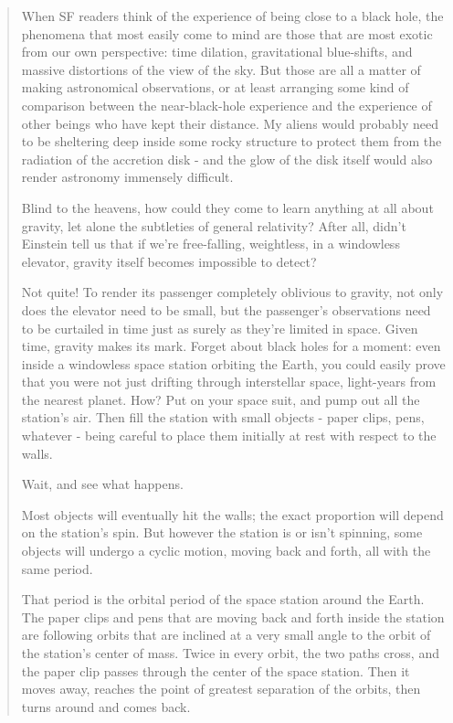 \begin{quote}
  When SF readers think of the experience of being close to a black 
  hole, the phenomena that most easily come to mind are those that are 
  most exotic from our own perspective: time dilation, gravitational 
  blue-shifts, and massive distortions of the view of the sky.  But 
  those are all a matter of making astronomical observations, or at 
  least arranging some kind of comparison between the near-black-hole 
  experience and the experience of other beings who have kept their 
  distance.  My aliens would probably need to be sheltering deep inside
  some rocky structure to protect them from the radiation of the 
  accretion disk - and the glow of the disk itself would also render 
  astronomy immensely difficult.

  Blind to the heavens, how could they come to learn anything at all 
  about gravity, let alone the subtleties of general relativity?  After
  all, didn't Einstein tell us that if we're free-falling, weightless, 
  in a windowless elevator, gravity itself becomes impossible to detect?

  Not quite!  To render its passenger completely oblivious to gravity, 
  not only does the elevator need to be small, but the passenger's 
  observations need to be curtailed in time just as surely as they're 
  limited in space.  Given time, gravity makes its mark.  Forget about 
  black holes for a moment: even inside a windowless space station 
  orbiting the Earth, you could easily prove that you were not just 
  drifting through interstellar space, light-years from the nearest 
  planet.  How?  Put on your space suit, and pump out all the station's 
  air.  Then fill the station with small objects - paper clips, pens, 
  whatever - being careful to place them initially at rest with respect
  to the walls.

  Wait, and see what happens.

  Most objects will eventually hit the walls; the exact proportion will
  depend on the station's spin. But however the station is or isn't
  spinning, some objects will undergo a cyclic motion, moving back and
  forth, all with the same period.

  That period is the orbital period of the space station around the 
  Earth.  The paper clips and pens that are moving back and forth 
  inside the station are following orbits that are inclined at a very 
  small angle to the orbit of the station's center of mass.  Twice in 
  every orbit, the two paths cross, and the paper clip passes through 
  the center of the space station.  Then it moves away, reaches the 
  point of greatest separation of the orbits, then turns around and 
  comes back.


\end{quote}
